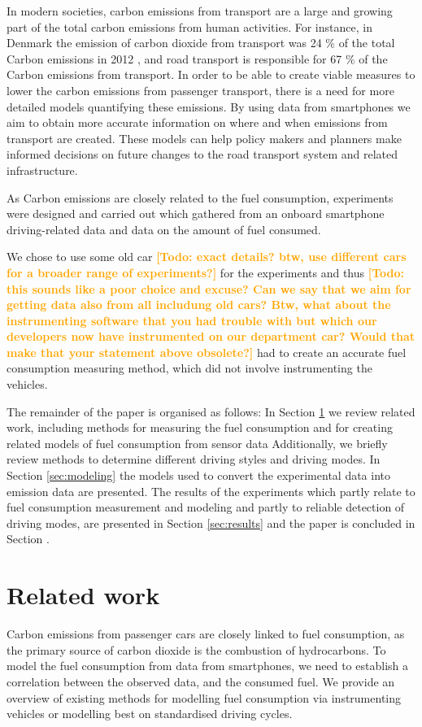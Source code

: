 \documentclass[conference]{IEEEtran}
\newcommand{\todo}[1]{\textsf{\textbf{\textcolor{Orange}{[Todo: #1]}}}}
\newcommand{\todo}[1]{}
\begin{document}
In modern societies, carbon emissions from transport are a large and growing part of the total carbon emissions from human activities. For instance, in Denmark the emission of carbon dioxide from transport was 24 \% of the total Carbon emissions in 2012 \cite{nielsen2014}, and road transport is responsible for 67 \% of the Carbon emissions from transport. In order to be able to create viable measures to lower the carbon emissions from passenger transport, there is a need for more detailed models quantifying these emissions. By using data from smartphones we aim to obtain more accurate information on where and when emissions from transport are created. These models can help policy makers and planners make informed decisions on future changes to the road transport system and related infrastructure.

As Carbon emissions are closely related to the fuel consumption, experiments were designed and carried out which gathered from an onboard smartphone  driving-related data and data on the amount of fuel consumed.

We chose to use some old car \todo{exact details? btw, use different cars for a broader range of experiments?} for the experiments and thus 
\todo{this sounds like a poor choice and excuse? Can we say that we aim for getting data also from all includung old cars? Btw, what about the instrumenting software that you had trouble with but which our developers now have instrumented on our department car? Would that make that your statement above obsolete?} had to create an accurate fuel consumption measuring method, which did not involve instrumenting the vehicles. 


The remainder of the paper is organised as follows:
In Section \ref{sec:relwork} we review related work, including methods for measuring the fuel consumption and for creating related models of fuel consumption from sensor data  Additionally, we briefly review methods to determine different driving styles and driving modes.
In Section \ref{sec:modeling} the models used to convert the experimental data into emission data are presented. 
The results of the experiments which partly relate to fuel consumption measurement and modeling and partly to reliable detection of driving modes, are presented in Section \ref{sec:results} and the paper is concluded in Section \label{sec:conclusions}.\section{Related work}
\label{sec:relwork}
 Carbon emissions from passenger cars are closely linked to fuel consumption, as the primary source of carbon dioxide is the combustion of hydrocarbons. To model the fuel consumption from  data from smartphones, we need to establish a correlation between the observed data, and the consumed fuel. We provide an overview of existing methods for modelling fuel consumption via instrumenting vehicles or modelling best on standardised driving cycles.
\end{document}
